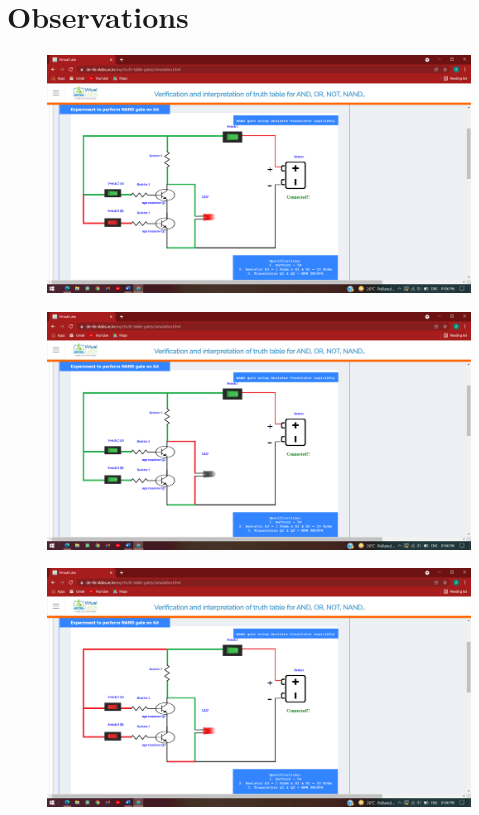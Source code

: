 \section{Observations}
	\begin{figure}[h]
		\centering
		\includegraphics[width=0.9\linewidth]{img/exp4/4}
		\caption{}
		\label{fig:4:4}
	\end{figure}
		\begin{figure}[h]
		\centering
		\includegraphics[width=0.9\linewidth]{img/exp4/5}
		\caption{}
		\label{fig:4:5}
	\end{figure}
		\begin{figure}[h]
		\centering
		\includegraphics[width=0.9\linewidth]{img/exp4/6}
		\caption{}
		\label{fig:4:6}
	\end{figure}
